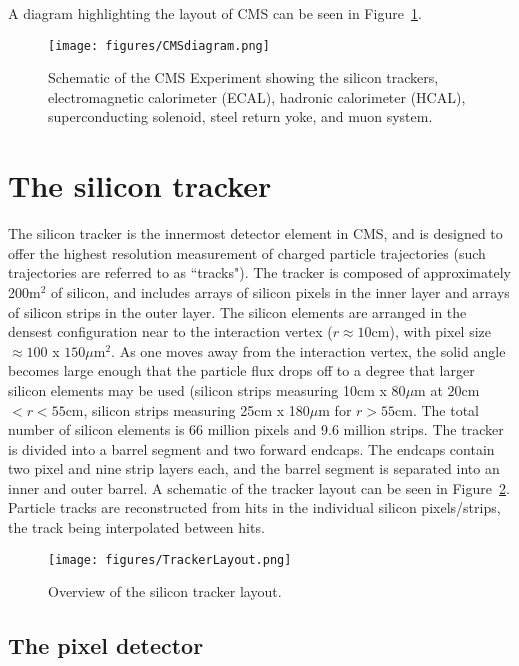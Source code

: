 A diagram highlighting the layout of CMS can be seen in Figure~\ref{fig:CMSdiagram}.

\begin{figure}\centering
  \texttt{[image: figures/CMSdiagram.png]}
  \caption{\label{fig:CMSdiagram} Schematic of the CMS Experiment showing the silicon trackers, electromagnetic calorimeter (ECAL), hadronic calorimeter (HCAL), superconducting solenoid, steel return yoke, and muon system.}
\end{figure}

\section{The silicon tracker}

The silicon tracker is the innermost detector element in CMS, and is designed to offer the highest resolution measurement of charged particle trajectories (such trajectories are referred to as ``tracks"). The tracker is composed of approximately 200m$^{2}$ of silicon, and includes arrays of silicon pixels in the inner layer and arrays of silicon strips in the outer layer. The silicon elements are arranged in the densest configuration near to the interaction vertex ($ r\approx 10$cm), with pixel size $\approx 100$ x $150 \mu$m$^{2}$. As one moves away from the interaction vertex, the solid angle becomes large enough that the particle flux drops off to a degree that larger silicon elements may be used (silicon strips measuring 10cm x 80$\mu$m at $20$cm$ < r < 55$cm, silicon strips measuring 25cm x 180$\mu$m for $r > 55$cm. The total number of silicon elements is 66 million pixels and 9.6 million strips. The tracker is divided into a barrel segment and two forward endcaps. The endcaps contain two pixel and nine strip layers each, and the barrel segment is separated into an inner and outer barrel. A schematic of the tracker layout can be seen in Figure~\ref{fig:TrackerLayout}. Particle tracks are reconstructed from hits in the individual silicon pixels/strips, the track being interpolated between hits.

\begin{figure}\centering
  \texttt{[image: figures/TrackerLayout.png]}
  \caption{\label{fig:TrackerLayout} Overview of the silicon tracker layout.}
\end{figure}


\subsection{The pixel detector}

